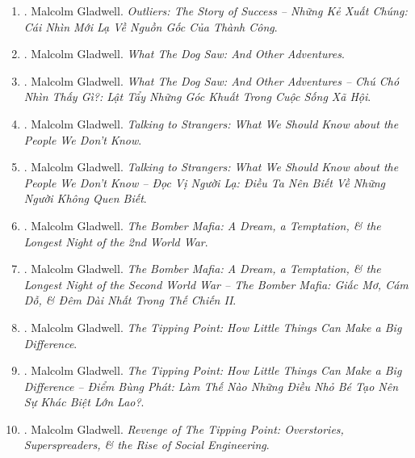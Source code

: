 \documentclass{article}
\begin{document}
\begin{enumerate}
	\item \cite{Gladwell_outlier_VN}. {\sc Malcolm Gladwell}. {\it Outliers: The Story of Success -- Những Kẻ Xuất Chúng: Cái Nhìn Mới Lạ Về Nguồn Gốc Của Thành Công}.\hfill{\sf[done]}
	
	\item \cite{Gladwell_dog}. {\sc Malcolm Gladwell}. {\it What The Dog Saw: And Other Adventures}.\hfill{\sf[reading]}
	
	\item \cite{Gladwell_dog_VN}. {\sc Malcolm Gladwell}. {\it What The Dog Saw: And Other Adventures -- Chú Chó Nhìn Thấy Gì?: Lật Tẩy Những Góc Khuất Trong Cuộc Sống Xã Hội}.\hfill{\sf[done]}
	
	\item \cite{Gladwell_stranger}. {\sc Malcolm Gladwell}. {\it Talking to Strangers: What We Should Know about the People We Don't Know}.\hfill{\sf[reading]}
	
	\item \cite{Gladwell_stranger_VN}. {\sc Malcolm Gladwell}. {\it Talking to Strangers: What We Should Know about the People We Don't Know -- Đọc Vị Người Lạ: Điều Ta Nên Biết Về Những Người Không Quen Biết}.\hfill{\sf[done]}
	
	\item \cite{Gladwell_bomber_mafia}. {\sc Malcolm Gladwell}. {\it The Bomber Mafia: A Dream, a Temptation, \& the Longest Night of the 2nd World War}.\hfill{\sf[reading]}
	
	\item \cite{Gladwell_bomber_mafia_VN}. {\sc Malcolm Gladwell}. {\it The Bomber Mafia: A Dream, a Temptation, \& the Longest Night of the Second World War -- The Bomber Mafia: Giấc Mơ, Cám Dỗ, \& Đêm Dài Nhất Trong Thế Chiến II}.\hfill{\sf[done]}
	
	\item \cite{Gladwell_tipping_point}. {\sc Malcolm Gladwell}. {\it The Tipping Point: How Little Things Can Make a Big Difference}.\hfill{\sf[reading]}
	
	\item \cite{Gladwell_tipping_point_VN}. {\sc Malcolm Gladwell}. {\it The Tipping Point: How Little Things Can Make a Big Difference -- Điểm Bùng Phát: Làm Thế Nào Những Điều Nhỏ Bé Tạo Nên Sự Khác Biệt Lớn Lao?}.\hfill{\sf[done]}
	
	\item \cite{Gladwell_revenge_tipping_point}. {\sc Malcolm Gladwell}. {\it Revenge of The Tipping Point: Overstories, Superspreaders, \& the Rise of Social Engineering}. {}\hfill{\sf[reading]}
	

\end{enumerate}
\end{document}
